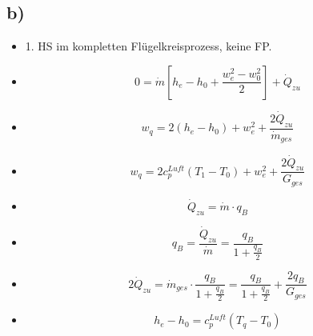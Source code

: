 

\subsection*{b)}

\begin{itemize}
    \item 1. HS im kompletten Flügelkreisprozess, keine FP.
    \item \[
    0 = \dot{m} \left[ h_e - h_0 + \frac{w_e^2 - w_0^2}{2} \right] + \dot{Q}_{zu}
    \]
    \item \[
    w_{q} = 2 \left( h_e - h_0 \right) + w_e^2 + \frac{2 \dot{Q}_{zu}}{\dot{m}_{ges}}
    \]
    \item \[
    w_{q} = 2 c_p^{Luft} \left( T_1 - T_0 \right) + w_e^2 + \frac{2 \dot{Q}_{zu}}{G_{ges}}
    \]
    \item \[
    \dot{Q}_{zu} = \dot{m} \cdot q_B
    \]
    \item \[
    q_B = \frac{\dot{Q}_{zu}}{\dot{m}} = \frac{q_B}{1 + \frac{q_B}{2}}
    \]
    \item \[
    2 \dot{Q}_{zu} = \dot{m}_{ges} \cdot \frac{q_B}{1 + \frac{q_B}{2}} = \frac{q_B}{1 + \frac{q_B}{2}} + \frac{2 q_B}{G_{ges}}
    \]
    \item \[
    h_e - h_0 = c_p^{Luft} \left( T_q - T_0 \right)
    \]
\end{itemize}